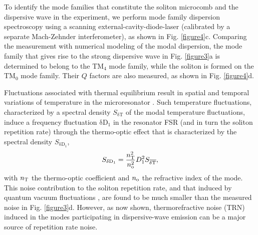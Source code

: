 \documentclass[noshowpacs,amsmath,
twocolumn,
superscriptaddress,
8pt,
aps,prb]{revtex4-2}
\begin{document}
To identify the mode families that constitute the soliton microcomb and the dispersive wave in the experiment, we perform mode family dispersion spectroscopy using a scanning external-cavity-diode-laser (calibrated by a separate Mach-Zehnder interferometer), as shown in Fig. \ref{figure4}c. Comparing the measurement with numerical modeling of the modal dispersion, the mode family that gives rise to the strong dispersive wave in Fig. \ref{figure3}a is determined to belong to the TM$_{4}$ mode family, while the soliton is formed on the TM$_{0}$ mode family. Their $Q$ factors are also measured, as shown in Fig. \ref{figure4}d.

\medskip
{}

\noindent Fluctuations associated with thermal equilibrium result in spatial and temporal variations of temperature in the microresonator \cite{gorodetsky2004fundamental,matsko2007whispering,levin2008fluctuation,kondratiev2018thermorefractive,huang2019thermorefractive}. Such temperature fluctuations, characterized by a spectral density $S_{\mathrm{\delta T}}$ of the modal temperature fluctuations, induce  a frequency fluctuation $\mathrm{\delta D_1}$ in the resonator FSR (and in turn the soliton repetition rate) through the thermo-optic effect that is characterized by the spectral density $S_{\mathrm{\delta D_1}}$,
\begin{equation}
    S_{\mathrm{\delta D_1}}=\frac{n_{\rm T}^2}{n_{\rm o}^2}D_1^2 S_{\overline{\mathrm{\delta T}}},
\end{equation}
with $n_{\rm T}$ the thermo-optic coefficient and $n_{\rm o}$ the refractive index of the mode. This noise contribution to the soliton repetition rate, and that induced by quantum vacuum fluctuations \cite{matsko2013timing,bao2020quantum}, are found to be much smaller than the measured noise in Fig. \ref{figure3}d. However, as now shown, thermorefractive noise (TRN) induced in the modes participating in dispersive-wave emission can be a major source of repetition rate noise. 
\end{document}
